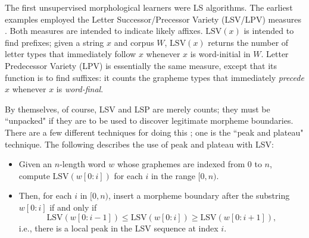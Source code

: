 The first unsupervised morphological learners were LS algorithms. The earliest examples employed the Letter Successor/Precessor Variety (LSV/LPV) measures \citep{harris:1955, harris:1967}. 
Both measures are intended to indicate likely affixes.
$\text{LSV}(x)$ is intended to find prefixes; given a string $x$ and corpus $W$, $\text{LSV}(x)$ returns the number of letter types that immediately follow $x$ whenever $x$ is word-initial in $W$.
Letter Predecessor Variety (LPV) is essentially the same measure, except that its function is to find suffixes:
it counts the grapheme types that immediately \emph{precede} $x$ whenever $x$ is \emph{word-final}.

By themselves, of course, LSV and LSP are merely counts; they must be ``unpacked" if they are to be used to discover legitimate morpheme boundaries.
There are a few different techniques for doing this
\citep[see][]{hammarstrom:2011}; one is the ``peak and plateau" technique. The following describes the use of peak and plateau with LSV: 

\begin{itemize}
\item Given an $n$-length word $w$ whose graphemes are indexed from 0 to $n$, compute $\text{LSV}(w[0:i])$ for each $i$ in the range $[0, n)$.
\item Then, for each $i$ in $[0, n)$, insert a morpheme boundary after the substring $w[0:i]$ if and only if 
\begin{equation*}
\text{LSV}(w[0:i-1]) \le \text{LSV}(w[0:i]) \ge \text{LSV}(w[0:i+1]),
\end{equation*}
i.e., there is a local peak in the LSV sequence at index $i$.
\end{itemize}

